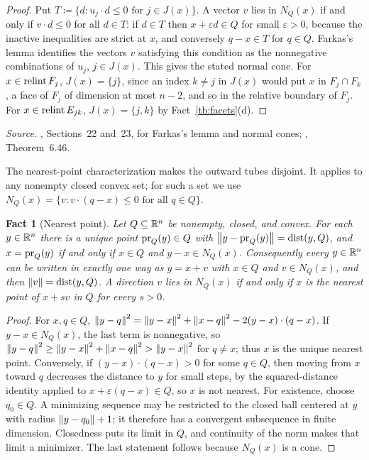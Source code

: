 \documentclass[11pt,letterpaper]{article}
\theoremstyle{plain}
\newtheorem{fact}{Fact}[section]
\begin{document}
\begin{proof}
Put \(T\coloneqq \{d:u_j\cdot d\le0\text{ for }j\in J(x)\}\). A vector \(v\) lies in
\(N_Q(x)\) if and only if \(v\cdot d\le0\) for all \(d\in T\): if \(d\in T\)
then \(x+\varepsilon d\in Q\) for small \(\varepsilon>0\), because the
inactive inequalities are strict at \(x\), and conversely \(q-x\in T\) for
\(q\in Q\). Farkas's lemma identifies the vectors \(v\) satisfying this
condition as the nonnegative combinations of \(u_j\), \(j\in J(x)\).
This gives the stated normal cone. For \(x\in\operatorname{relint} F_j\), \(J(x)=\{j\}\), since an index \(k\ne j\) in
\(J(x)\) would put \(x\) in \(F_j\cap F_k\), a face of \(F_j\) of dimension
at most \(n-2\), and so in the relative boundary of \(F_j\). For
\(x\in\operatorname{relint} E_{jk}\), \(J(x)=\{j,k\}\) by Fact~\ref{tb:facets}(d).
\end{proof}

\emph{Source.} , Sections~22 and~23, for Farkas's lemma and normal
cones; , Theorem~6.46.

The nearest-point characterization makes the outward tubes disjoint.
It applies to any nonempty closed convex set; for such a set we use
\(N_Q(x)=\{v:v\cdot(q-x)\le0\text{ for all }q\in Q\}\).

\begin{fact}[Nearest point]\label{tb:projection}
Let \(Q\subseteq\mathbb R^n\) be nonempty, closed, and convex. For each
\(y\in\mathbb R^n\) there is a unique point \(\operatorname{pr}_Q(y)\in Q\) with
\(\left\lVert y-\operatorname{pr}_Q(y)\right\rVert=\operatorname{dist}(y,Q)\), and \(x=\operatorname{pr}_Q(y)\) if and only if
\(x\in Q\) and \(y-x\in N_Q(x)\). Consequently every \(y\in\mathbb R^n\) can be
written in exactly one way as \(y=x+v\) with \(x\in Q\) and \(v\in N_Q(x)\),
and then \(\left\lVert v\right\rVert=\operatorname{dist}(y,Q)\). A direction \(v\) lies in \(N_Q(x)\) if and
only if \(x\) is the nearest point of \(x+s v\) in \(Q\) for every \(s>0\).
\end{fact}

\begin{proof}
For \(x,q\in Q\), \(\left\lVert y-q\right\rVert^2=\left\lVert y-x\right\rVert^2+\left\lVert x-q\right\rVert^2-2(y-x)\cdot(q-x)\).
If \(y-x\in N_Q(x)\), the last term is nonnegative, so
\(\left\lVert y-q\right\rVert^2\ge\left\lVert y-x\right\rVert^2+\left\lVert x-q\right\rVert^2>\left\lVert y-x\right\rVert^2\) for \(q\ne x\); thus
\(x\) is the unique nearest point. Conversely, if \((y-x)\cdot(q-x)>0\) for
some \(q\in Q\), then moving from \(x\) toward \(q\) decreases the distance
to \(y\) for small steps, by the squared-distance identity applied to
\(x+\varepsilon(q-x)\in Q\), so \(x\) is not nearest. For existence, choose \(q_0\in Q\). A minimizing sequence may be
restricted to the closed ball centered at \(y\) with radius
\(\left\lVert y-q_0\right\rVert+1\); it therefore has a convergent subsequence in
finite dimension. Closedness puts its limit in \(Q\), and continuity
of the norm makes that limit a minimizer. The last statement follows because \(N_Q(x)\) is a
cone.
\end{proof}
\end{document}
